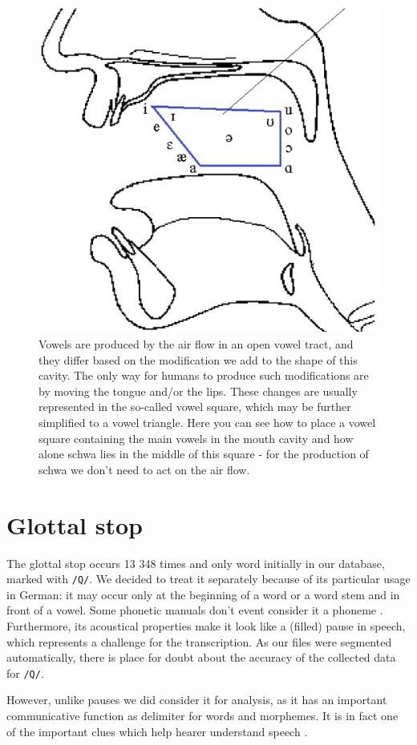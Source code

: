 \documentclass[11pt,a4paper]{scrbook}
\begin{document}
\begin{figure}[htbp]
	\includegraphics[width=.5\linewidth]{../Graphen/vow_art.eps}
	\centering
\vspace{5mm}
	\caption[Vowel square]{Vowels are produced by the air flow in an open vowel tract, and they differ based on the modification we add to the shape of this cavity. The only way for humans to produce such modifications are by moving the tongue and/or the lips. These changes are usually represented in the so-called vowel square, which may be further simplified to a vowel triangle. Here you can see how to place a vowel square containing the main vowels in the mouth cavity and how alone schwa lies in the middle of this square - for the production of schwa we don't need to act on the air flow. }
	\label{fig:vow_square}
\end{figure}

\section{Glottal stop}
\label{Q}
The glottal stop occurs 13 348 times and only word initially in our database, marked with \texttt{/Q/}. We decided to treat it separately because of its particular usage in German: it may occur only at the beginning of a word or a word stem and in front of a vowel. Some phonetic manuals don't event consider it a phoneme \cite{Ternes2012}. Furthermore, its acoustical properties make it look like a (filled) pause in speech, which represents a challenge for the transcription. As our files were segmented automatically, there is place for doubt about the accuracy of the collected data for \texttt{/Q/}.

However, unlike pauses we did consider it  for analysis, as it has an important communicative function as delimiter for words and morphemes. It is in fact one of the important clues which help hearer understand speech \cite{Ternes2012}. 
\end{document}
